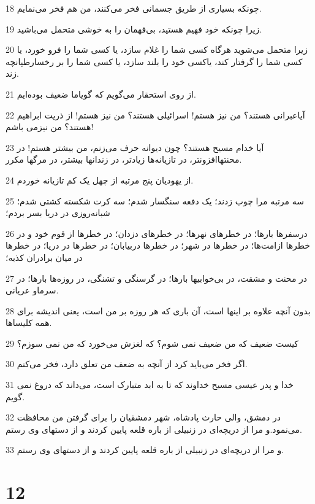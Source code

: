 \par 18 چونکه بسیاری از طریق جسمانی فخر می‌کنند، من هم فخر می‌نمایم.
\par 19 زیرا چونکه خود فهیم هستید، بی‌فهمان را به خوشی متحمل می‌باشید.
\par 20 زیرا متحمل می‌شوید هرگاه کسی شما را غلام سازد، یا کسی شما را فرو خورد، یا کسی شما را گرفتار کند، یاکسی خود را بلند سازد، یا کسی شما را بر رخسارطپانچه زند.
\par 21 از روی استحقار می‌گویم که گویاما ضعیف بوده‌ایم.
\par 22 آیاعبرانی هستند؟ من نیز هستم! اسرائیلی هستند؟ من نیز هستم! از ذریت ابراهیم هستند؟ من نیزمی باشم!
\par 23 آیا خدام مسیح هستند؟ چون دیوانه حرف می‌زنم، من بیشتر هستم! در محنتهاافزونتر، در تازیانه‌ها زیادتر، در زندانها بیشتر، در مرگها مکرر.
\par 24 از یهودیان پنج مرتبه از چهل یک کم تازیانه خوردم.
\par 25 سه مرتبه مرا چوب زدند؛ یک دفعه سنگسار شدم؛ سه کرت شکسته کشتی شدم؛ شبانه‌روزی در دریا بسر بردم؛
\par 26 درسفرها بارها؛ در خطرهای نهرها؛ در خطرهای دزدان؛ در خطرها از قوم خود و در خطرها ازامت‌ها؛ در خطرها در شهر؛ در خطرها دربیابان؛ در خطرها در دریا؛ در خطرها در میان برادران کذبه؛
\par 27 در محنت و مشقت، در بی‌خوابیها بارها؛ در گرسنگی و تشنگی، در روزه‌ها بارها؛ در سرماو عریانی.
\par 28 بدون آنچه علاوه بر اینها است، آن باری که هر روزه بر من است، یعنی اندیشه برای همه کلیساها.
\par 29 کیست ضعیف که من ضعیف نمی شوم؟ که لغزش می‌خورد که من نمی سوزم؟
\par 30 اگر فخر می‌باید کرد از آنچه به ضعف من تعلق دارد، فخر می‌کنم.
\par 31 خدا و پدر عیسی مسیح خداوند که تا به ابد متبارک است، می‌داند که دروغ نمی گویم.
\par 32 در دمشق، والی حارث پادشاه، شهر دمشقیان را برای گرفتن من محافظت می‌نمود.و مرا از دریچه‌ای در زنبیلی از باره قلعه پایین کردند و از دستهای وی رستم.
\par 33 و مرا از دریچه‌ای در زنبیلی از باره قلعه پایین کردند و از دستهای وی رستم.

\chapter{12}

